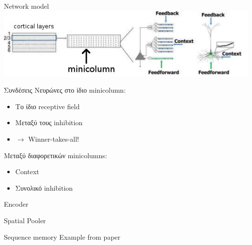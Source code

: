 \documentclass[11pt,center]{beamer}
\begin{document}
\begin{frame}{Network model}
  \centering
  \includegraphics[width=\textwidth]{../pics/minicolumn}

  \vspace{-0.5em}
  \begin{block}{Συνδέσεις}
	Νευρώνες στο ίδιο minicolumn:
	\vspace{-0.5em}
    \begin{itemize}
      \item Tο ίδιο receptive field
      \item Μεταξύ τους inhibition
      \item[] $\rightarrow$ Winner-takes-all!
    \end{itemize}

	Μεταξύ διαφορετικών minicolumns:
	\vspace{-0.5em}
	\begin{itemize}
	  \item Context
	  \item Συνολικό inhibition
	\end{itemize}
  \end{block}
\end{frame}


\begin{frame}{Encoder}
\end{frame}

\begin{frame}{Spatial Pooler}
\end{frame}

\begin{frame}{Sequence memory}
  Example from paper
\end{frame}
\end{document}
